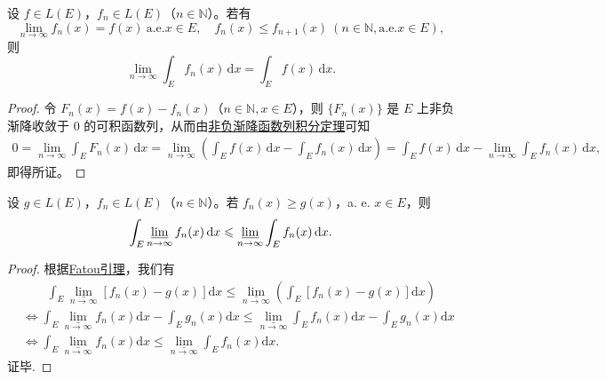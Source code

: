 \documentclass[../../main.tex]{subfiles}%
\begin{document}
\begin{theorem}\label{theorem:递增可测函数列的积分和极限可交换}
设 $f \in L(E)$，$f_n \in L(E)$（$n \in \mathbb{N}$）。若有
\[
\lim_{n \to \infty} f_n(x) = f(x) \ \text{a.e.} x \in E, \quad f_n(x) \leqslant f_{n + 1}(x) \ (n \in \mathbb{N}, \text{a.e.} x \in E),
\]
则
\[
\lim_{n \to \infty} \int_E f_n(x) \, \mathrm{d}x = \int_E f(x) \, \mathrm{d}x.
\]
\end{theorem}
\begin{proof}
 
令 $F_n(x) = f(x) - f_n(x)$（$n \in \mathbb{N}, x \in E$），则 $\{ F_n(x) \}$ 是 $E$ 上非负渐降收敛于 $0$ 的可积函数列，从而由\hyperref[corollary:非负渐降函数列积分定理]{非负渐降函数列积分定理}可知
\begin{align*}
0 = \lim_{n \to \infty} \int_E F_n(x) \, \mathrm{d}x 
= \lim_{n \to \infty} \left( \int_E f(x) \, \mathrm{d}x - \int_E f_n(x) \, \mathrm{d}x \right) 
= \int_E f(x) \, \mathrm{d}x - \lim_{n \to \infty} \int_E f_n(x) \, \mathrm{d}x,
\end{align*}
即得所证。

\end{proof}

\begin{proposition}
设 $g \in L(E)$，$f_n \in L(E)$（$n \in \mathbb{N}$）。若 $f_n(x) \geqslant g(x)$，a. e. $x \in E$，则
\[
\int_E \varliminf_{n \to \infty} f_n(x) \, \mathrm{d}x \leqslant \varliminf_{n \to \infty} \int_E f_n(x) \, \mathrm{d}x.
\]
\end{proposition}
\begin{proof}

根据\hyperref[theorem:Fatou引理]{Fatou引理}，我们有
\begin{align*}
&\quad \quad \int_E{\underset{n\rightarrow \infty}{\underline{\lim }}\left[ f_n\left( x \right) -g\left( x \right) \right] \mathrm{d}x}\leqslant \underset{n\rightarrow \infty}{\underline{\lim }}\left( \int_E{\left[ f_n\left( x \right) -g\left( x \right) \right] \mathrm{d}x} \right) 
\\
&\Longleftrightarrow \int_E{\underset{n\rightarrow \infty}{\underline{\lim }}f_n\left( x \right) \mathrm{d}x}-\int_E{g_n\left( x \right) \mathrm{d}x}\leqslant \underset{n\rightarrow \infty}{\underline{\lim }}\int_E{f_n\left( x \right) \mathrm{d}x}-\int_E{g_n\left( x \right) \mathrm{d}x}
\\
&\Longleftrightarrow \int_E{\underset{n\rightarrow \infty}{\underline{\lim }}f_n\left( x \right) \mathrm{d}x}\leqslant \underset{n\rightarrow \infty}{\underline{\lim }}\int_E{f_n\left( x \right) \mathrm{d}x}.
\end{align*}
证毕.

\end{proof}
\end{document}
